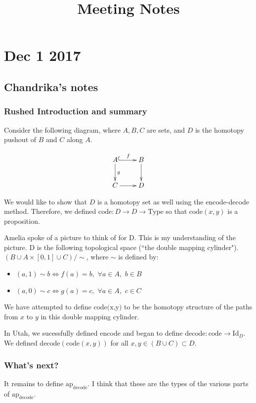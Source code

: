 \documentclass[11pt]{amsart}
\title{Meeting Notes}
\author{}
\theoremstyle{remark}
\theoremstyle{definition}
\begin{document}
\maketitle

\section{Dec 1 2017}
\subsection{Chandrika's notes}
\subsubsection{Rushed Introduction and summary} Consider the following diagram, where $A, B, C$ are sets, and $D$ is the homotopy pushout of $B$ and $C$ along $A$.

\begin{displaymath}
	\xymatrix{A \ar@{^{(}->}[r]^{f} \ar[d]^{g} & B \ar[d] \\
	C \ar[r] & D
	}
\end{displaymath}

We would like to show that $D$ is a homotopy set as well using the encode-decode method. Therefore, we defined $\text{code}: D \rightarrow D \rightarrow \text{Type}$ so that $\text{code}(x,y)$ is a proposition.

Amelia spoke of a picture to think of for D. This is my understanding of the picture. D is the following topological space (``the double mapping cylinder"). $(B \cup A \times [0,1] \cup C) / \sim$, where $\sim$ is defined by:
\begin{itemize}
	\item $(a,1) \sim b \iff f(a)=b,$ $\forall a \in A,$ $b \in B$
	\item $(a,0) \sim c \iff g(a)=c,$ $\forall a \in A,$ $c \in C$
\end{itemize}
We have attempted to define $\text{code(x,y)}$ to be the homotopy structure of the paths from $x$ to $y$ in this double mapping cylinder.

In Utah, we sucessfully defined encode and  began to define $\text{decode}: \text{code} \rightarrow \text{Id}_D$. We defined $\text{decode}(\text{code}(x,y))$ for all $x, y \in (B \cup C) \subset D$.

\subsubsection{What's next?} It remains to define $\text{ap}_{\text{decode}}$. I think that these are the types of the various parts of $\text{ap}_{\text{decode}}$.
\end{document}
